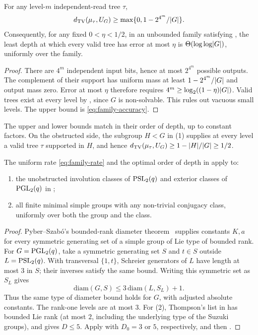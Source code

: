 \begin{proposition}
\label{prop:depth-lower}
For any level-$m$ independent-read tree $\tau$,
\[
 d_{\mathrm{TV}}(\mu_\tau,U_G)\ge\max\{0,1-2^{4^m}/\lvert G \rvert\}.
\]
Consequently, for any fixed $0<\eta<1/2$, in an unbounded family satisfying
, the least depth at which every valid tree has
error at most $\eta$ is $\Theta(\log\log\lvert G \rvert)$, uniformly over the family.
\end{proposition}
\begin{proof}
There are $4^m$ independent input bits, hence at most $2^{4^m}$ possible
outputs. The complement of their support has uniform mass at least
$1-2^{4^m}/\lvert G \rvert$ and output mass zero. Error at most $\eta$ therefore
requires $4^m\ge\log_2((1-\eta)\lvert G \rvert)$.
Valid trees exist at every level by , since $G$ is
non-solvable. This rules out vacuous small levels. The upper bound is
\eqref{eq:family-accuracy}.
\end{proof}

The upper and lower bounds match in their order of depth, up to constant factors.
On the obstructed side, the subgroup $H<G$ in (1)
supplies at every level a valid tree $\tau$ supported in $H$, and hence
$d_{\mathrm{TV}}(\mu_\tau,U_G)\ge1-\lvert H \rvert/\lvert G \rvert\ge1/2$.

\begin{corollary}
\label{cor:family-examples}
The uniform rate \eqref{eq:family-rate} and the optimal order of depth in
 apply to:
\begin{enumerate}[nosep,leftmargin=1.6em]
\item the unobstructed involution classes of $\operatorname{PSL}_2(q)$ and exterior
classes of $\operatorname{PGL}_2(q)$ in ;
\item all finite minimal simple groups with any non-trivial conjugacy
class, uniformly over both the group and the class.
\end{enumerate}
\end{corollary}
\begin{proof}
Pyber--Szab\'o's bounded-rank diameter theorem~\cite[Theorem 2 of the
preprint]{PyberSzabo2016} supplies constants $K,a$ for every symmetric
generating set of a simple group of Lie type of bounded rank.
For $G=\operatorname{PGL}_2(q)$, take a symmetric generating set $S$ and $t\in S$
outside $L=\operatorname{PSL}_2(q)$. With transversal $\{1,t\}$, Schreier generators
of $L$ have length at most $3$ in $S$; their inverses satisfy the same
bound. Writing this symmetric set as $S_L$ gives
\[
 \mathrm{diam}(G,S)\le3\,\mathrm{diam}(L,S_L)+1.
\]
Thus the same type of diameter bound holds for $G$, with adjusted absolute
constants. The rank-one levels are at most $3$.
For (2), Thompson's list in  has bounded Lie rank
(at most $2$, including the underlying type of the Suzuki groups), and
 gives $D\le5$. Apply  with
$D_0=3$ or $5$, respectively, and then .
\end{proof}

